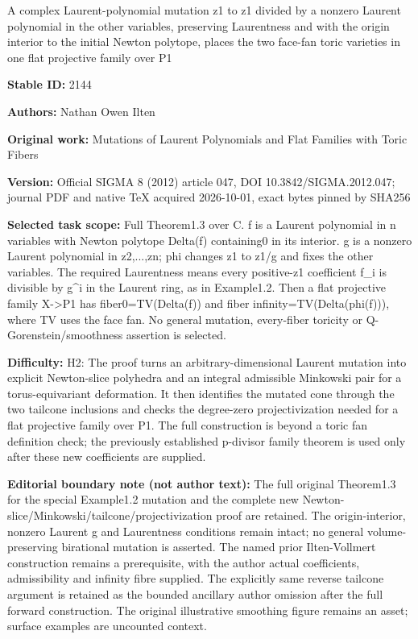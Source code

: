 \documentclass[11pt]{article}
\begin{document}
\begin{center}\Large A complex Laurent-polynomial mutation z1 to z1 divided by a nonzero Laurent polynomial in the other variables, preserving Laurentness and with the origin interior to the initial Newton polytope, places the two face-fan toric varieties in one flat projective family over P1\end{center}
\noindent\textbf{Stable ID:} 2144\par
\noindent\textbf{Authors:} Nathan Owen Ilten\par
\noindent\textbf{Original work:} Mutations of Laurent Polynomials and Flat Families with Toric Fibers\par
\noindent\textbf{Version:} Official SIGMA 8 (2012) article 047, DOI 10.3842/SIGMA.2012.047; journal PDF and native TeX acquired 2026-10-01, exact bytes pinned by SHA256\par
\noindent\textbf{Selected task scope:} Full Theorem1.3 over C. f is a Laurent polynomial in n variables with Newton polytope Delta(f) containing0 in its interior. g is a nonzero Laurent polynomial in z2,...,zn; phi changes z1 to z1/g and fixes the other variables. The required Laurentness means every positive-z1 coefficient f\_i is divisible by g\textasciicircum{}i in the Laurent ring, as in Example1.2. Then a flat projective family X->P1 has fiber0=\allowbreak{}TV(Delta(f)) and fiber infinity=\allowbreak{}TV(Delta(phi(f))), where TV uses the face fan. No general mutation, every-fiber toricity or Q-Gorenstein/smoothness assertion is selected.\par
\noindent\textbf{Difficulty:} H2: The proof turns an arbitrary-dimensional Laurent mutation into explicit Newton-slice polyhedra and an integral admissible Minkowski pair for a torus-equivariant deformation. It then identifies the mutated cone through the two tailcone inclusions and checks the degree-zero projectivization needed for a flat projective family over P1. The full construction is beyond a toric fan definition check; the previously established p-divisor family theorem is used only after these new coefficients are supplied.\par
\noindent\textbf{Editorial boundary note (not author text):} The full original Theorem1.3 for the special Example1.2 mutation and the complete new Newton-slice/Minkowski/tailcone/projectivization proof are retained. The origin-interior, nonzero Laurent g and Laurentness conditions remain intact; no general volume-preserving birational mutation is asserted. The named prior Ilten-Vollmert construction remains a prerequisite, with the author actual coefficients, admissibility and infinity fibre supplied. The explicitly same reverse tailcone argument is retained as the bounded ancillary author omission after the full forward construction. The original illustrative smoothing figure remains an asset; surface examples are uncounted context.\par
\end{document}

